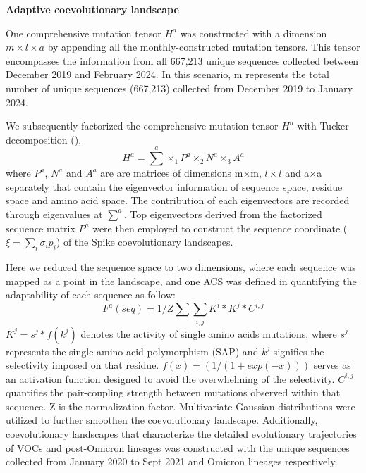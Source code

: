 \documentclass{sysbio}%
\begin{document}
\vspace{1.0em}


\textbf{Adaptive coevolutionary landscape}

One comprehensive mutation tensor $H^a$ was constructed with a dimension $m\times l\times a$ by appending all the monthly-constructed mutation tensors. This tensor encompasses the information from all 667,213 unique sequences collected between December 2019 and February 2024. In this scenario, m  represents the total number of unique sequences (667,213) collected from December 2019 to January 2024.

We subsequently factorized the comprehensive mutation tensor $H^a$ with Tucker decomposition (\cite{tucker}), 
\begin{equation}\label{lad:eq:decom}
    H^a={\sum}^a \times_1 P^a \times_2 N^a \times_3 A^a
\end{equation}
where $P^a$, $N^a$ and $A^a$ are are matrices of dimensions m×m, $l×l$ and a×a separately that contain the eigenvector information of sequence space, residue space and amino acid space. The contribution of each eigenvectors are recorded through eigenvalues at ${\sum}
^a$. Top eigenvectors derived from the factorized sequence matrix $P^a$ were then employed to construct the sequence coordinate ($\xi=\sum_i \sigma_i p_i$) of the Spike coevolutionary landscapes.%

Here we reduced the sequence space to two dimensions, where each sequence was mapped as a point in the landscape, and one ACS was defined in quantifying the adaptability of each sequence as follow: 
\begin{equation}\label{lad:eq:fittness}
    F^a (seq)= 1/Z \sum \sum_{i,j}K^i*K^j*C^{i,j}
\end{equation}
$K^j=s^j*f(k^j)$ denotes the activity of single amino acids mutations, where $s^j$ represents the single amino acid polymorphism (SAP) and $k^j$ signifies the selectivity imposed on that residue. $f(x)=(1/(1+exp(-x)))$ serves as an activation function designed to avoid the overwhelming of the selectivity. $C^{i,j}$ quantifies the pair-coupling strength between mutations observed within that sequence. Z is the normalization factor. Multivariate Gaussian distributions were utilized to further smoothen the coevolutionary landscape. Additionally, coevolutionary landscapes that characterize the detailed evolutionary trajectories of VOCs and post-Omicron lineages was constructed with the unique sequences collected from January 2020 to Sept 2021 and Omicron lineages respectively.
\end{document}
